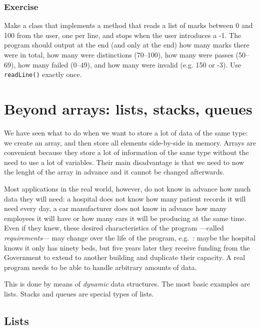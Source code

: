 %
%
%
%
%
%

\subsubsection*{Exercise}

Make a class that implements a method 
that reads a list of marks between 0 and 100 from the
user, one per line, and stops when the user introduces a -1. The
program should output at the end (and only at the end) how many marks
there were in total, how many were distinctions (70--100), how many
were passes (50--69), how many failed (0--49), and how many were
invalid (e.g. 150 or -3). Use \texttt{readLine()} exactly once.

\section{Beyond arrays: lists, stacks, queues}
\label{sec:beyond-arrays:-lists}

We have seen what to do when we want to store a lot of data of the
same type: we create an array, and then store all elements
side-by-side in memory. Arrays are convenient because they store a lot
of information of the same type without 
the need to use a lot of variables. Their main disadvantage is that we
need to now the lenght of the array in advance and it cannot be
changed afterwards. 

Most applications in the real world, however, do not know in advance
how much data they will need: a hospital does not know how many
patient records it will need every day, a car manufacturer does not
know in advance how many employees it will have or how many cars it
will be producing at the same time. Even if they knew, these
desired characteristics of the program ---called
\emph{requirements}--- may change over the life of the program, e.g.~:
maybe the hospital knows it only has ninety beds, but five years later
they receive funding from the Government to extend to another building
and duplicate their capacity. A real program needs to be able to
handle arbitrary amounts of data. 

This is done by means of \emph{dynamic} data structures. The most basic
examples are lists. Stacks and queues are special types of lists. 

\subsection{Lists}
\label{sec:lists}

